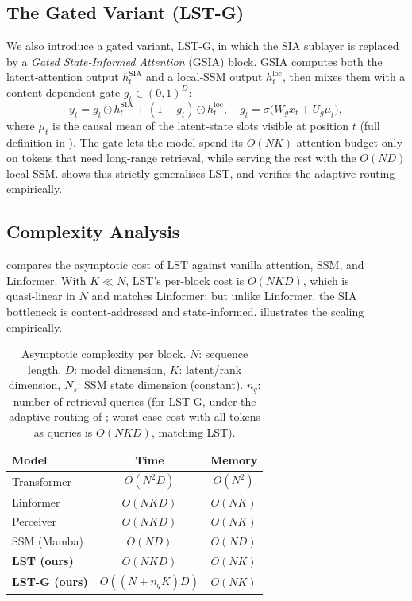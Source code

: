 \documentclass[10pt,twocolumn,letterpaper]{article}
\newcommand{\LST}{\textsc{LST}}
\newcommand{\SIA}{\textsc{SIA}}
\newcommand{\GSIA}{\textsc{GSIA}}
\begin{document}
\subsection{The Gated Variant (\LST-G{})}
\label{sec:gated}

We also introduce a gated variant, \LST-G{}, in which the \SIA{} sublayer
is replaced by a \emph{Gated State‑Informed Attention} (\GSIA{}) block.
\GSIA{} computes both the latent‑attention output $h^{\text{SIA}}_t$ and
a local‑SSM output $h^{\text{loc}}_t$, then mixes them with a
content‑dependent gate $g_t\!\in\!(0,1)^D$:
\begin{equation}
    y_t = g_t \odot h^{\text{SIA}}_t + (1 - g_t) \odot h^{\text{loc}}_t,\quad
    g_t = \sigma\!\big(W_g x_t + U_g \mu_t\big),
\end{equation}
where $\mu_t$ is the causal mean of the latent‑state slots visible at
position $t$ (full definition in ).  The gate lets the
model spend its $O(NK)$ attention budget only on tokens that need
long‑range retrieval, while serving the rest with the $O(ND)$ local SSM.
 shows this strictly generalises \LST{}, and
 verifies the adaptive routing empirically.

\subsection{Complexity Analysis}
\label{sec:complexity}

 compares the asymptotic cost of \LST{} against vanilla attention, SSM, and Linformer.  With $K\!\ll\!N$, \LST{}'s per‑block cost is $O(NKD)$, which is quasi‑linear in $N$ and matches Linformer; but unlike Linformer, the \SIA{} bottleneck is content‑addressed and state‑informed.   illustrates the scaling empirically.

\begin{table}[t]
\centering
\caption{Asymptotic complexity per block.  $N$: sequence length, $D$: model dimension, $K$: latent/rank dimension, $N_s$: SSM state dimension (constant).  $n_q$: number of retrieval queries (for \LST-G{}, under the adaptive routing of ; worst-case cost with all tokens as queries is $O(NKD)$, matching \LST{}).}
\label{tab:complexity}
\small
\begin{tabular}{lcc}
\toprule
Model & Time & Memory \\
\midrule
Transformer~\cite{vaswani2017attention} & $O(N^2 D)$ & $O(N^2)$ \\
Linformer~\cite{wang2020linformer} & $O(NK D)$ & $O(NK)$ \\
Perceiver~\cite{jaegle2021perceiver} & $O(NK D)$ & $O(NK)$ \\
SSM (Mamba)~\cite{gu2023mamba} & $O(N D)$ & $O(N D)$ \\
\textbf{\LST{} (ours)} & $O(NK D)$ & $O(NK)$ \\
\textbf{\LST-G{} (ours)} & $O((N\!+\!n_q K)D)$ & $O(NK)$ \\
\bottomrule
\end{tabular}
\end{table}
\end{document}
